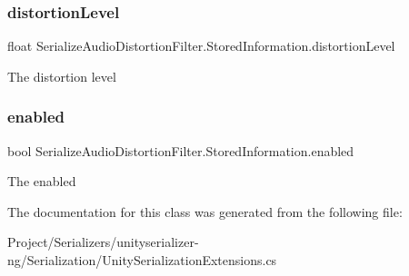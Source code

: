 \subsubsection{\texorpdfstring{distortion\+Level}{distortionLevel}}
{\footnotesize\ttfamily float Serialize\+Audio\+Distortion\+Filter.\+Stored\+Information.\+distortion\+Level}



The distortion level 

\mbox{\label{class_serialize_audio_distortion_filter_1_1_stored_information_aafbf4022fa143520dd73a6c779fd3340}} 
\subsubsection{\texorpdfstring{enabled}{enabled}}
{\footnotesize\ttfamily bool Serialize\+Audio\+Distortion\+Filter.\+Stored\+Information.\+enabled}



The enabled 



The documentation for this class was generated from the following file\+:\begin{DoxyCompactItemize}
\item 
Project/\+Serializers/unityserializer-\/ng/\+Serialization/Unity\+Serialization\+Extensions.\+cs\end{DoxyCompactItemize}
